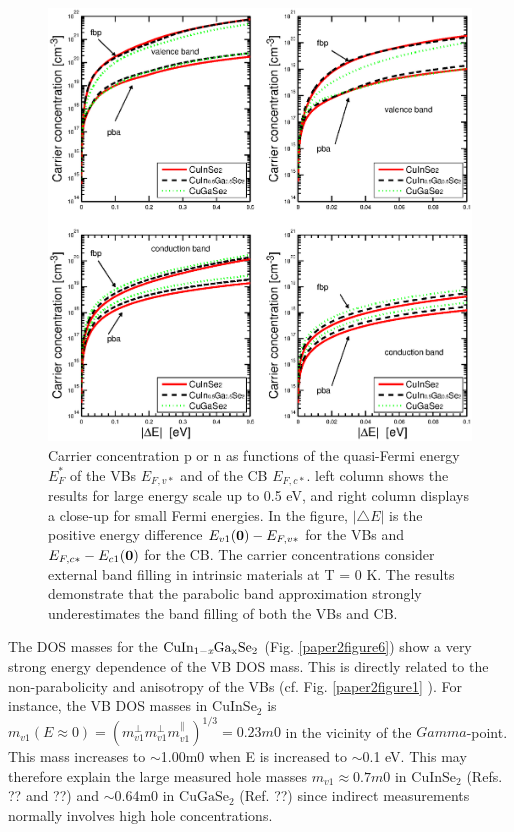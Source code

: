 \documentclass[a4paper, 12pt, titlepage,oneside,drop]{kthesis}
\begin{document}
\begin{figure}[H]
\begin{center}
\includegraphics[scale=.6]{paper2figure5.eps}
\end{center}
\caption{ Carrier concentration p or n as functions of the quasi-Fermi energy $E_F^*$ of the VBs $E_{F,v*}$ and of the CB $E_{F,c*}$. 
left column shows the results for large energy scale up to 0.5 eV, and right column displays a close-up for small Fermi energies. 
In the figure, $|\bigtriangleup E|$ is the positive energy difference $E_{v1}(\textbf 0) - E_{F,v*}$ for the VBs and $E_{F,c*} - E_{c1}(\textbf 0)$ for the CB. 
The carrier concentrations consider external band filling in intrinsic materials at T = 0 K. The results demonstrate that the parabolic band approximation strongly
underestimates the band filling of both the VBs and CB. }
\label{paper2figure5}
\end{figure}


The DOS masses for the $\mathrm { CuIn_{1-\textit{x}}Ga_{x}Se_2}$ (Fig. \ref{paper2figure6}) show a very strong energy dependence of the VB DOS mass. This is directly related to the non-parabolicity and anisotropy
of the VBs (cf. Fig. \ref{paper2figure1} ). For instance, the VB DOS masses in $\mathrm {CuInSe_2}$ is $m_{v1}(E \approx 0) = (m^{\perp}_{v1}m^{\perp}_{v1}m^{\parallel}_{v1})^{1/3} = 0.23m0$ in the vicinity of the $Gamma$-point. This mass increases to $\sim$1.00m0 when
E is increased to $\sim$0.1 eV. This may therefore explain the large measured hole masses $m_{v1} \approx 0.7m0$ in $\mathrm {CuInSe_2}$ (Refs. ?? and ??) and $\sim$0.64m0 in $\mathrm {CuGaSe_2}$ (Ref. ??) since
indirect measurements normally involves high hole concentrations.
\end{document}
